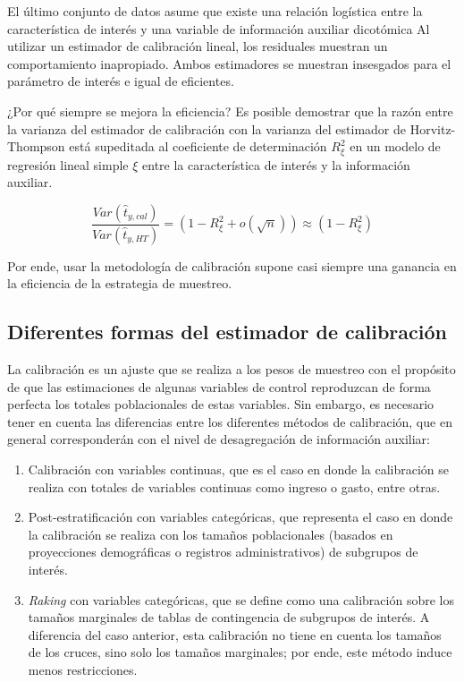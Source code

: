 \documentclass[
  10pt,
  spanish,
]{book}
\providecommand{\tightlist}{%
  \setlength{\itemsep}{0pt}\setlength{\parskip}{0pt}}
\begin{document}
El último conjunto de datos asume que existe una relación logística entre la característica de interés y una variable de información auxiliar dicotómica Al utilizar un estimador de calibración lineal, los residuales muestran un comportamiento inapropiado. Ambos estimadores se muestran insesgados para el parámetro de interés e igual de eficientes.

¿Por qué siempre se mejora la eficiencia? Es posible demostrar que la razón entre la varianza del estimador de calibración con la varianza del estimador de Horvitz-Thompson está supeditada al coeficiente de determinación \(R^2_{\xi}\) en un modelo de regresión lineal simple \(\xi\) entre la característica de interés y la información auxiliar.

\[
\frac{Var(\hat t_{y, cal})}{Var(\hat t_{y, HT})} = (1-R^2_{\xi} + o(\sqrt{n})) \approx (1-R^2_{\xi})
\]

Por ende, usar la metodología de calibración supone casi siempre una ganancia en la eficiencia de la estrategia de muestreo.

\hypertarget{diferentes-formas-del-estimador-de-calibraciuxf3n}{%
\subsection{Diferentes formas del estimador de calibración}\label{diferentes-formas-del-estimador-de-calibraciuxf3n}}

La calibración es un ajuste que se realiza a los pesos de muestreo con el propósito de que las estimaciones de algunas variables de control reproduzcan de forma perfecta los totales poblacionales de estas variables. Sin embargo, es necesario tener en cuenta las diferencias entre los diferentes métodos de calibración, que en general corresponderán con el nivel de desagregación de información auxiliar:

\begin{enumerate}
\def\labelenumi{\arabic{enumi}.}
\tightlist
\item
  Calibración con variables continuas, que es el caso en donde la calibración se realiza con totales de variables continuas como ingreso o gasto, entre otras.
\item
  Post-estratificación con variables categóricas, que representa el caso en donde la calibración se realiza con los tamaños poblacionales (basados en proyecciones demográficas o registros administrativos) de subgrupos de interés.
\item
  \emph{Raking} con variables categóricas, que se define como una calibración sobre los tamaños marginales de tablas de contingencia de subgrupos de interés. A diferencia del caso anterior, esta calibración no tiene en cuenta los tamaños de los cruces, sino solo los tamaños marginales; por ende, este método induce menos restricciones.
\end{enumerate}
\end{document}
